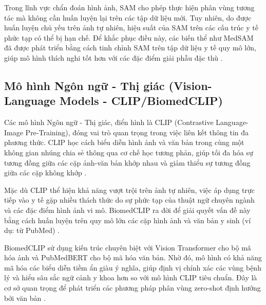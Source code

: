 Trong lĩnh vực chẩn đoán hình ảnh, SAM cho phép thực hiện phân vùng tương tác mà không cần huấn luyện lại trên các tập dữ liệu mới. Tuy nhiên, do được huấn luyện chủ yếu trên ảnh tự nhiên, hiệu suất của SAM trên các cấu trúc y tế phức tạp có thể bị hạn chế. Để khắc phục điều này, các biến thể như MedSAM đã được phát triển bằng cách tinh chỉnh SAM trên tập dữ liệu y tế quy mô lớn, giúp mô hình thích nghi tốt hơn với các đặc điểm giải phẫu đặc thù \cite{ma2024medsam}.

\subsection{Mô hình Ngôn ngữ - Thị giác (Vision-Language Models - CLIP/BiomedCLIP)}
Các mô hình Ngôn ngữ - Thị giác, điển hình là CLIP (Contrastive Language-Image Pre-Training), đóng vai trò quan trọng trong việc liên kết thông tin đa phương thức. CLIP học cách biểu diễn hình ảnh và văn bản trong cùng một không gian nhúng chia sẻ thông qua cơ chế học tương phản, giúp tối đa hóa sự tương đồng giữa các cặp ảnh-văn bản khớp nhau và giảm thiểu sự tương đồng giữa các cặp không khớp \cite{radford2021clip}.

Mặc dù CLIP thể hiện khả năng vượt trội trên ảnh tự nhiên, việc áp dụng trực tiếp vào y tế gặp nhiều thách thức do sự phức tạp của thuật ngữ chuyên ngành và các đặc điểm hình ảnh vi mô. BiomedCLIP ra đời để giải quyết vấn đề này bằng cách huấn luyện trên quy mô lớn các cặp hình ảnh và văn bản y sinh (ví dụ: từ PubMed) \cite{zhang2024biomedclip}.

BiomedCLIP sử dụng kiến trúc chuyên biệt với Vision Transformer cho bộ mã hóa ảnh và PubMedBERT cho bộ mã hóa văn bản. Nhờ đó, mô hình có khả năng mã hóa các biểu diễn tiềm ẩn giàu ý nghĩa, giúp định vị chính xác các vùng bệnh lý và hiểu sâu sắc ngữ cảnh y khoa hơn so với mô hình CLIP tiêu chuẩn. Đây là cơ sở quan trọng để phát triển các phương pháp phân vùng zero-shot định hướng bởi văn bản \cite{zhang2024biomedclip}.
\newpage